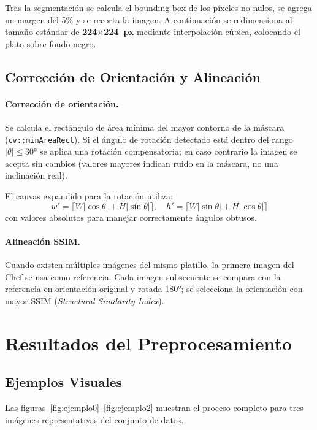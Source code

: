 \documentclass[12pt,a4paper]{article}
\begin{document}
Tras la segmentación se calcula el bounding box de los píxeles no
nulos, se agrega un margen del 5\% y se recorta la imagen.  A
continuación se redimensiona al tamaño estándar de
\textbf{224$\times$224~px} mediante interpolación cúbica, colocando el
plato sobre fondo negro.

\subsection{Corrección de Orientación y Alineación}

\paragraph{Corrección de orientación.}
Se calcula el rectángulo de área mínima del mayor contorno de la
máscara (\texttt{cv::minAreaRect}).  Si el ángulo de rotación
detectado está dentro del rango $|\theta| \leq 30°$ se aplica una
rotación compensatoria; en caso contrario la imagen se acepta sin
cambios (valores mayores indican ruido en la máscara, no una
inclinación real).

El canvas expandido para la rotación utiliza:
\[
  w' = \lceil W|\cos\theta| + H|\sin\theta| \rceil, \quad
  h' = \lceil W|\sin\theta| + H|\cos\theta| \rceil
\]
con valores absolutos para manejar correctamente ángulos obtusos.

\paragraph{Alineación SSIM.}
Cuando existen múltiples imágenes del mismo platillo, la primera
imagen del Chef se usa como referencia.  Cada imagen subsecuente se
compara con la referencia en orientación original y rotada 180°;
se selecciona la orientación con mayor SSIM
(\textit{Structural Similarity Index}).

\section{Resultados del Preprocesamiento}

\subsection{Ejemplos Visuales}

Las figuras~\ref{fig:ejemplo0}--\ref{fig:ejemplo2} muestran el
proceso completo para tres imágenes representativas del conjunto de
datos.
\end{document}

